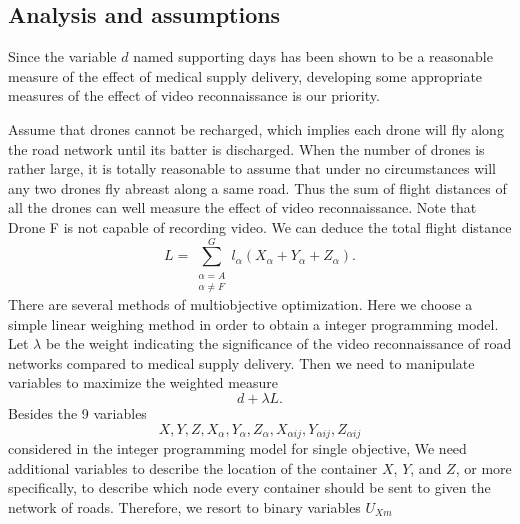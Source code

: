\documentclass{mcmthesis}
\begin{document}
\subsection{Analysis and assumptions}
 Since the variable $d$ named supporting days has been shown to be a reasonable measure of the effect of medical supply delivery, developing some appropriate measures of the effect of video reconnaissance is our priority.

\noindent Assume that drones cannot be recharged, which implies each drone will fly along the road network until its batter is discharged. When the number of drones is rather large, it is totally reasonable to assume that under no circumstances will any two drones fly abreast along a same road. Thus the sum of flight distances of all the drones can well measure the effect of video reconnaissance. Note that Drone F is not capable of recording video. We can deduce the total flight distance
\[
L=\sum_{\substack{\alpha=A\\ \alpha\ne F}}^{G}l_\alpha (X_\alpha+Y_\alpha+Z_\alpha).
\]
There are several methods of multiobjective optimization. Here we choose a simple linear weighing method in order to obtain a integer programming model. Let $\lambda$ be the weight indicating the significance of the video reconnaissance of road networks compared to medical supply delivery. Then we need to manipulate variables to maximize the weighted measure
\[
d+\lambda L.
\] 
Besides the 9 variables
\[
X,Y,Z,X_{\alpha},Y_{\alpha},Z_{\alpha},X_{\alpha ij},Y_{\alpha ij},Z_{\alpha ij}
\]
considered in the integer programming model for single objective, We need additional variables to describe the location of the container $X$, $Y$, and $Z$, or more specifically, to describe which node  every container should be sent to given the network of roads. Therefore, we resort to binary variables $U_{Xm}$
\end{document}
